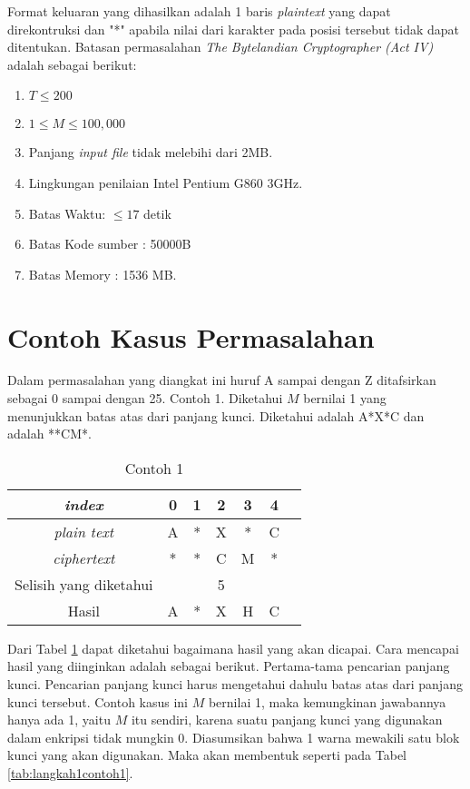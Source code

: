 	
	Format keluaran yang dihasilkan adalah 1 baris \textit{plaintext} yang dapat direkontruksi dan "*" apabila nilai dari karakter pada posisi tersebut tidak dapat ditentukan. 
	Batasan permasalahan \textit{The Bytelandian Cryptographer (Act IV)} adalah sebagai berikut:
	\begin{enumerate}
		\item $T \leq 200$
		\item $1 \leq M \leq 100,000$
		\item Panjang \textit{input file} tidak melebihi dari 2MB.
		\item Lingkungan penilaian Intel Pentium G860 3GHz.
		\item Batas Waktu: $\leq17$ detik
		\item Batas Kode sumber : 50000B
		\item Batas Memory : 1536 MB.                 
	\end{enumerate}

	\section{Contoh Kasus Permasalahan}
	Dalam permasalahan yang diangkat ini huruf A sampai dengan Z ditafsirkan sebagai 0 sampai dengan 25.
	Contoh 1. Diketahui $M$ bernilai 1 yang menunjukkan batas atas dari panjang kunci. Diketahui \plaintext adalah A*X*C dan \ciphertext adalah **CM*. 
	\begin{table}[H]
	 	\centering
		\caption{Contoh 1}	 	
	 	\begin{tabular}{|c|c|c|c|c|c|c|}\hline
	 	\textit{index}&0&1&2&3&4\\ \hline
	 	\textit{plain text}&A&*&X&*&C\\ \hline
	 	\textit{ciphertext}&*&*&C&M&*\\ \hline
	 	Selisih yang diketahui& & &5& & \\ \hline
	 	Hasil              &A&*&X&H&C\\ \hline
	 	\end{tabular}
	 	\label{tab:contoh1}
	\end{table}
	 
	 Dari Tabel \ref{tab:contoh1} dapat diketahui bagaimana hasil yang akan dicapai. Cara mencapai hasil yang diinginkan adalah sebagai berikut. Pertama-tama pencarian panjang kunci. Pencarian panjang kunci harus mengetahui dahulu batas atas dari panjang kunci tersebut. Contoh kasus ini $M$ bernilai 1, maka kemungkinan jawabannya hanya ada 1, yaitu $M$ itu sendiri, karena suatu panjang kunci yang digunakan dalam enkripsi tidak mungkin 0. Diasumsikan bahwa 1 warna mewakili satu blok kunci yang akan digunakan. Maka akan membentuk seperti pada Tabel \ref{tab:langkah1contoh1}.
	 
